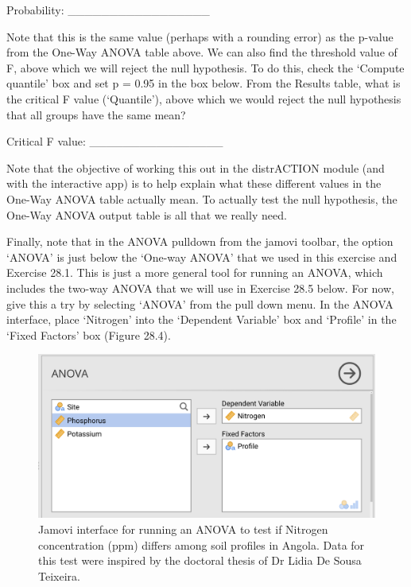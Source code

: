 \documentclass[
]{scrbook}
\begin{document}
Probability: \_\_\_\_\_\_\_\_\_\_\_\_\_\_\_\_\_

Note that this is the same value (perhaps with a rounding error) as the p-value from the One-Way ANOVA table above.
We can also find the threshold value of F, above which we will reject the null hypothesis.
To do this, check the `Compute quantile' box and set p = 0.95 in the box below.
From the Results table, what is the critical F value (`Quantile'), above which we would reject the null hypothesis that all groups have the same mean?

Critical F value: \_\_\_\_\_\_\_\_\_\_\_\_\_\_\_\_

Note that the objective of working this out in the distrACTION module (and with the interactive app) is to help explain what these different values in the One-Way ANOVA table actually mean.
To actually test the null hypothesis, the One-Way ANOVA output table is all that we really need.

Finally, note that in the ANOVA pulldown from the jamovi toolbar, the option `ANOVA' is just below the `One-way ANOVA' that we used in this exercise and Exercise 28.1.
This is just a more general tool for running an ANOVA, which includes the two-way ANOVA that we will use in Exercise 28.5 below.
For now, give this a try by selecting `ANOVA' from the pull down menu.
In the ANOVA interface, place `Nitrogen' into the `Dependent Variable' box and `Profile' in the `Fixed Factors' box (Figure 28.4).

\begin{figure}
\includegraphics[width=1\linewidth]{img/jamovi_ANOVA_input} \caption{Jamovi interface for running an ANOVA to test if Nitrogen concentration (ppm) differs among soil profiles in Angola. Data for this test were inspired by the doctoral thesis of Dr Lidia De Sousa Teixeira.}\label{fig:unnamed-chunk-129}
\end{figure}
\end{document}
